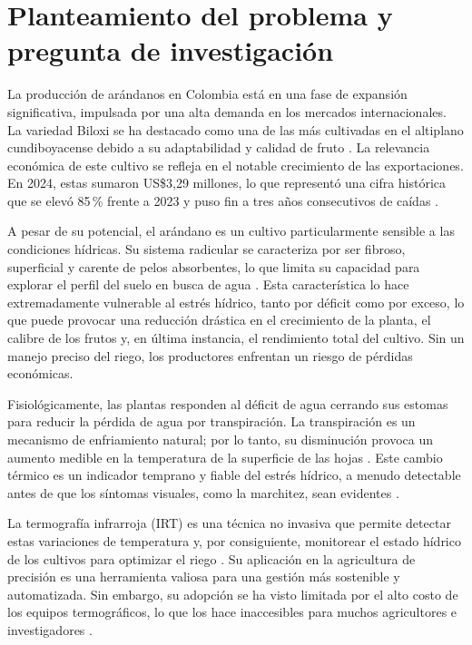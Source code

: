 \section{Planteamiento del problema y pregunta de investigación}
\label{sec:planteamiento_problema}

La producción de arándanos en Colombia está en una fase de expansión significativa, impulsada por una alta demanda en los mercados internacionales. La variedad Biloxi se ha destacado como una de las más cultivadas en el altiplano cundiboyacense debido a su adaptabilidad y calidad de fruto . La relevancia económica de este cultivo se refleja en el notable crecimiento de las exportaciones. En 2024, estas sumaron US\$3,29 millones, lo que representó una cifra histórica que se elevó 85\,\% frente a 2023 y puso fin a tres años consecutivos de caídas .

A pesar de su potencial, el arándano es un cultivo particularmente sensible a las condiciones hídricas. Su sistema radicular se caracteriza por ser fibroso, superficial y carente de pelos absorbentes, lo que limita su capacidad para explorar el perfil del suelo en busca de agua . Esta característica lo hace extremadamente vulnerable al estrés hídrico, tanto por déficit como por exceso, lo que puede provocar una reducción drástica en el crecimiento de la planta, el calibre de los frutos y, en última instancia, el rendimiento total del cultivo. Sin un manejo preciso del riego, los productores enfrentan un riesgo de pérdidas económicas.

Fisiológicamente, las plantas responden al déficit de agua cerrando sus estomas para reducir la pérdida de agua por transpiración. La transpiración es un mecanismo de enfriamiento natural; por lo tanto, su disminución provoca un aumento medible en la temperatura de la superficie de las hojas . Este cambio térmico es un indicador temprano y fiable del estrés hídrico, a menudo detectable antes de que los síntomas visuales, como la marchitez, sean evidentes .

La termografía infrarroja (IRT) es una técnica no invasiva que permite detectar estas variaciones de temperatura y, por consiguiente, monitorear el estado hídrico de los cultivos para optimizar el riego . Su aplicación en la agricultura de precisión es una herramienta valiosa para una gestión más sostenible y automatizada. Sin embargo, su adopción se ha visto limitada por el alto costo de los equipos termográficos, lo que los hace inaccesibles para muchos agricultores e investigadores .

